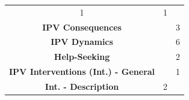 \documentclass[]{tufte-handout}
\begin{document}
\begin{longtable}[]{@{}cll@{}}
\begin{minipage}[t]{0.22\columnwidth}
1\strut
\end{minipage} & \begin{minipage}[t]{0.22\columnwidth}\raggedright\strut
1\strut
\end{minipage}\tabularnewline
\begin{minipage}[t]{0.47\columnwidth}\centering\strut
\textbf{IPV Consequences}\strut
\end{minipage} & \begin{minipage}[t]{0.22\columnwidth}\raggedright\strut
\strut
\end{minipage} & \begin{minipage}[t]{0.22\columnwidth}\raggedright\strut
3\strut
\end{minipage}\tabularnewline
\begin{minipage}[t]{0.47\columnwidth}\centering\strut
\textbf{IPV Dynamics}\strut
\end{minipage} & \begin{minipage}[t]{0.22\columnwidth}\raggedright\strut
\strut
\end{minipage} & \begin{minipage}[t]{0.22\columnwidth}\raggedright\strut
6\strut
\end{minipage}\tabularnewline
\begin{minipage}[t]{0.47\columnwidth}\centering\strut
\textbf{Help-Seeking}\strut
\end{minipage} & \begin{minipage}[t]{0.22\columnwidth}\raggedright\strut
\strut
\end{minipage} & \begin{minipage}[t]{0.22\columnwidth}\raggedright\strut
2\strut
\end{minipage}\tabularnewline
\begin{minipage}[t]{0.47\columnwidth}\centering\strut
\textbf{IPV Interventions (Int.) - General}\strut
\end{minipage} & \begin{minipage}[t]{0.22\columnwidth}\raggedright\strut
\strut
\end{minipage} & \begin{minipage}[t]{0.22\columnwidth}\raggedright\strut
1\strut
\end{minipage}\tabularnewline
\begin{minipage}[t]{0.47\columnwidth}\centering\strut
\textbf{Int. - Description}\strut
\end{minipage} & \begin{minipage}[t]{0.22\columnwidth}\raggedright\strut
2\strut

\end{minipage}
\end{longtable}
\end{document}
